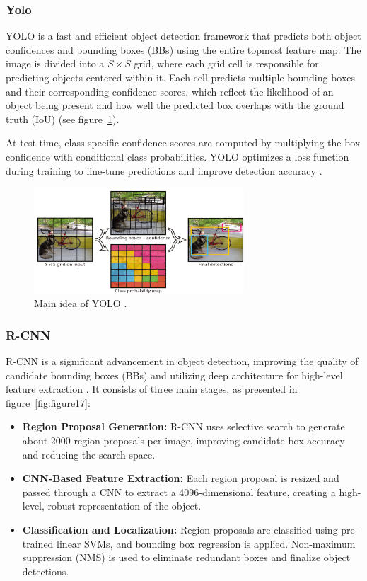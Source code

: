\subsubsection{Yolo}
YOLO is a fast and efficient object detection framework that predicts both object confidences and bounding boxes (BBs) using the entire topmost feature map. The image is divided into a $S \times S$ grid, where each grid cell is responsible for predicting objects centered within it. Each cell predicts multiple bounding boxes and their corresponding confidence scores, which reflect the likelihood of an object being present and how well the predicted box overlaps with the ground truth (IoU) (see figure~\ref{fig:figure16}).

At test time, class-specific confidence scores are computed by multiplying the box confidence with conditional class probabilities. YOLO optimizes a loss function during training to fine-tune predictions and improve detection accuracy \parencite{zhao2019objectdetection}.

\begin{figure}[H] %
    \centering
    \includegraphics[width=0.7\textwidth]{chapters/chapter1/images/Figure16.png}
    \caption{Main idea of YOLO \parencite{zhao2019objectdetection}.}
    \label{fig:figure16}
\end{figure}

\subsubsection{R-CNN}
R-CNN is a significant advancement in object detection, improving the quality of candidate bounding boxes (BBs) and utilizing deep architecture for high-level feature extraction \parencite{zhao2019objectdetection}. It consists of three main stages, as presented in figure~\ref{fig:figure17}:

\begin{itemize}
    \item \textbf{Region Proposal Generation:} R-CNN uses selective search to generate about 2000 region proposals per image, improving candidate box accuracy and reducing the search space.
    \item \textbf{CNN-Based Feature Extraction:} Each region proposal is resized and passed through a CNN to extract a 4096-dimensional feature, creating a high-level, robust representation of the object.
    \item \textbf{Classification and Localization:} Region proposals are classified using pre-trained linear SVMs, and bounding box regression is applied. Non-maximum suppression (NMS) is used to eliminate redundant boxes and finalize object detections.
\end{itemize}

